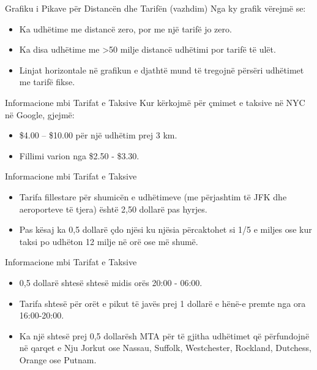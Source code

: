 \documentclass[
  ignorenonframetext,
]{beamer}
\begin{document}
\begin{frame}{Grafiku i Pikave për Distancën dhe Tarifën (vazhdim)}
\protect\hypertarget{grafiku-i-pikave-puxebr-distancuxebn-dhe-tarifuxebn-vazhdim-1}{}
Nga ky grafik vërejmë se:

\begin{itemize}
\item
  Ka udhëtime me distancë zero, por me një tarifë jo zero.
\item
  Ka disa udhëtime me \textgreater50 milje distancë udhëtimi por tarifë
  të ulët.
\item
  Linjat horizontale në grafikun e djathtë mund të tregojnë përsëri
  udhëtimet me tarifë fikse.
\end{itemize}
\end{frame}

\begin{frame}{Informacione mbi Tarifat e Taksive}
\protect\hypertarget{informacione-mbi-tarifat-e-taksive}{}
Kur kërkojmë për çmimet e taksive në NYC në Google, gjejmë:

\begin{itemize}
\item
  \$4.00 -- \$10.00 për një udhëtim prej 3 km.
\item
  Fillimi varion nga \$2.50 - \$3.30.
\end{itemize}
\end{frame}

\begin{frame}{Informacione mbi Tarifat e Taksive}
\protect\hypertarget{informacione-mbi-tarifat-e-taksive-1}{}
\begin{itemize}
\item
  Tarifa fillestare për shumicën e udhëtimeve (me përjashtim të JFK dhe
  aeroporteve të tjera) është 2,50 dollarë pas hyrjes.
\item
  Pas kësaj ka 0,5 dollarë çdo njësi ku njësia përcaktohet si 1/5 e
  miljes ose kur taksi po udhëton 12 milje në orë ose më shumë.
\end{itemize}
\end{frame}

\begin{frame}{Informacione mbi Tarifat e Taksive}
\protect\hypertarget{informacione-mbi-tarifat-e-taksive-2}{}
\begin{itemize}
\item
  0,5 dollarë shtesë shtesë midis orës 20:00 - 06:00.
\item
  Tarifa shtesë për orët e pikut të javës prej 1 dollarë e hënë-e premte
  nga ora 16:00-20:00.
\item
  Ka një shtesë prej 0,5 dollarësh MTA për të gjitha udhëtimet që
  përfundojnë në qarqet e Nju Jorkut ose Nassau, Suffolk, Westchester,
  Rockland, Dutchess, Orange ose Putnam.
\end{itemize}
\end{frame}
\end{document}
